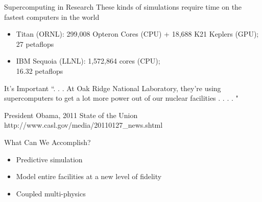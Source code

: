 \documentclass[xcolor=x11names,compress]{beamer}
\renewcommand{\(}{\begin{columns}}
\renewcommand{\)}{\end{columns}}
\newcommand{\<}[1]{\begin{column}{#1}}
\renewcommand{\>}{\end{column}}
\begin{document}
\begin{frame}{Supercomputing in Research}
These kinds of simulations require time on the fastest computers in the world
\begin{itemize}
\item \textcolor{RawSienna}{Titan} (ORNL): 299,008 Opteron Cores (CPU) + 18,688 K21 Keplers (GPU); 27 petaflops 
\item \textcolor{RawSienna}{IBM Sequoia} (LLNL): 1,572,864 cores (CPU); \\16.32 petaflops
\end{itemize}
\begin{figure}
\hfill
\end{figure}
\end{frame}

\begin{frame}{It's Important}
``. . . At Oak Ridge National Laboratory, they're using supercomputers to get a lot more power out of our nuclear facilities . . . . "

\vspace*{0.5 in}
President Obama, 2011 State of the Union\\
http://www.casl.gov/media/20110127\_news.shtml
\end{frame}

\begin{frame}{What Can We Accomplish?}
\begin{itemize}
\item Predictive simulation 
\item Model entire facilities at a new level of fidelity
\item Coupled multi-physics
\end{itemize}
\begin{figure}
\hfill
\end{figure}
\end{frame}
\end{document}
